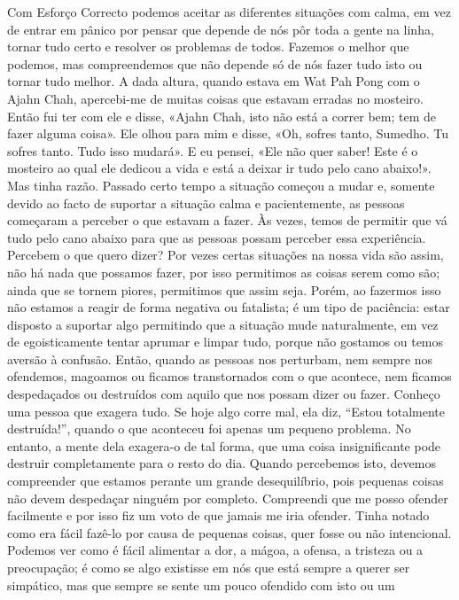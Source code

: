 Com Esforço Correcto podemos aceitar as diferentes
situações com calma, em vez de entrar em pânico por pensar
que depende de nós pôr toda a gente na linha, tornar tudo
certo e resolver os problemas de todos. Fazemos o melhor que
podemos, mas compreendemos que não depende só de nós
fazer tudo isto ou tornar tudo melhor.
A dada altura, quando estava em Wat Pah Pong com o
Ajahn Chah, apercebi-me de muitas coisas que estavam
erradas no mosteiro. Então fui ter com ele e disse, «Ajahn
Chah, isto não está a correr bem; tem de fazer alguma coisa».
Ele olhou para mim e disse, «Oh, sofres tanto, Sumedho. Tu
sofres tanto. Tudo isso mudará». E eu pensei, «Ele não quer
saber! Este é o mosteiro ao qual ele dedicou a vida e está a
deixar ir tudo pelo cano abaixo!». Mas tinha razão. Passado
certo tempo a situação começou a mudar e, somente devido
ao facto de suportar a situação calma e pacientemente, as
pessoas começaram a perceber o que estavam a fazer. Às
vezes, temos de permitir que vá tudo pelo cano abaixo para
que as pessoas possam perceber essa experiência.
Percebem o que quero dizer? Por vezes certas situações
na nossa vida são assim, não há nada que possamos fazer, por
isso permitimos as coisas serem como são; ainda que se
tornem piores, permitimos que assim seja. Porém, ao fazermos
isso não estamos a reagir de forma negativa ou fatalista; é um
tipo de paciência: estar disposto a suportar algo permitindo
que a situação mude naturalmente, em vez de egoisticamente
tentar aprumar e limpar tudo, porque não gostamos ou temos
aversão à confusão.
Então, quando as pessoas nos perturbam, nem sempre
nos ofendemos, magoamos ou ficamos transtornados com o
que acontece, nem ficamos despedaçados ou destruídos com
aquilo que nos possam dizer ou fazer. Conheço uma pessoa
que exagera tudo. Se hoje algo corre mal, ela diz, “Estou
totalmente destruída!”, quando o que aconteceu foi apenas
um pequeno problema. No entanto, a mente dela exagera-o de
tal forma, que uma coisa insignificante pode destruir
completamente para o resto do dia. Quando percebemos isto,
devemos compreender que estamos perante um grande
desequilíbrio, pois pequenas coisas não devem despedaçar
ninguém por completo.
Compreendi que me posso ofender facilmente e por isso
fiz um voto de que jamais me iria ofender. Tinha notado
como era fácil fazê-lo por causa de pequenas coisas, quer
fosse ou não intencional. Podemos ver como é fácil alimentar
a dor, a mágoa, a ofensa, a tristeza ou a preocupação; é como
se algo existisse em nós que está sempre a querer ser simpático,
mas que sempre se sente um pouco ofendido com isto ou um
